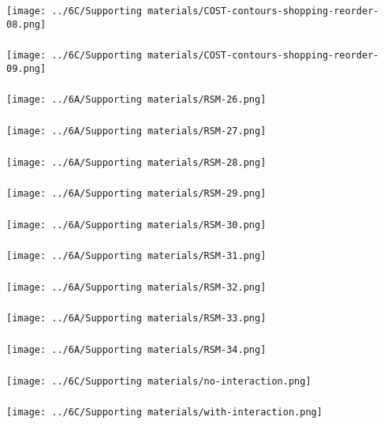 \begin{frame}\frametitle{}
	\centerline{\texttt{[image: ../6C/Supporting materials/COST-contours-shopping-reorder-08.png]}}
\end{frame}
\begin{frame}\frametitle{}
	\centerline{\texttt{[image: ../6C/Supporting materials/COST-contours-shopping-reorder-09.png]}}
\end{frame}
\begin{frame}\frametitle{}
	\centerline{\texttt{[image: ../6A/Supporting materials/RSM-26.png]}}
\end{frame}
\begin{frame}\frametitle{}
	\centerline{\texttt{[image: ../6A/Supporting materials/RSM-27.png]}}
\end{frame}
\begin{frame}\frametitle{}
	\centerline{\texttt{[image: ../6A/Supporting materials/RSM-28.png]}}
\end{frame}
\begin{frame}\frametitle{}
	\centerline{\texttt{[image: ../6A/Supporting materials/RSM-29.png]}}
\end{frame}
\begin{frame}\frametitle{}
	\centerline{\texttt{[image: ../6A/Supporting materials/RSM-30.png]}}
\end{frame}
\begin{frame}\frametitle{}
	\centerline{\texttt{[image: ../6A/Supporting materials/RSM-31.png]}}
\end{frame}
\begin{frame}\frametitle{}
	\centerline{\texttt{[image: ../6A/Supporting materials/RSM-32.png]}}
\end{frame}
\begin{frame}\frametitle{}
	\centerline{\texttt{[image: ../6A/Supporting materials/RSM-33.png]}}
\end{frame}
\begin{frame}\frametitle{}
	\centerline{\texttt{[image: ../6A/Supporting materials/RSM-34.png]}}
\end{frame}
\begin{frame}\frametitle{}
	\centerline{\texttt{[image: ../6C/Supporting materials/no-interaction.png]}}
\end{frame}
\begin{frame}\frametitle{}
	\centerline{\texttt{[image: ../6C/Supporting materials/with-interaction.png]}}
\end{frame}


